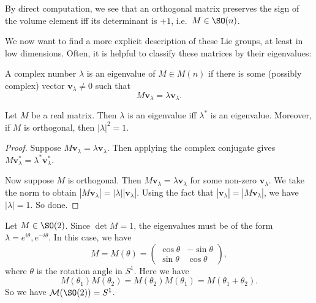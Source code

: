 \documentclass[a4paper]{article}
\begin{document}
By direct computation, we see that an orthogonal matrix preserves the sign of the volume element iff its determinant is $+1$, i.e.\ $M \in \SO(n)$.

We now want to find a more explicit description of these Lie groups, at least in low dimensions. Often, it is helpful to classify these matrices by their eigenvalues:

\begin{defi}[Eigenvalue]
  A complex number $\lambda$ is an eigenvalue of $M \in M(n)$ if there is some (possibly complex) vector $\mathbf{v}_\lambda \not= 0$ such that
  \[
    M \mathbf{v}_\lambda = \lambda \mathbf{v}_\lambda.
  \]
\end{defi}

\begin{thm}
  Let $M$ be a real matrix. Then $\lambda$ is an eigenvalue iff $\lambda^*$ is an eigenvalue. Moreover, if $M$ is orthogonal, then $|\lambda|^2 = 1$.
\end{thm}

\begin{proof}
  Suppose $M \mathbf{v}_\lambda = \lambda \mathbf{v}_\lambda$. Then applying the complex conjugate gives $M \mathbf{v}_\lambda^* = \lambda^* \mathbf{v}_\lambda^*$.

  Now suppose $M$ is orthogonal. Then $M\mathbf{v}_\lambda = \lambda \mathbf{v}_\lambda$ for some non-zero $\mathbf{v}_\lambda$. We take the norm to obtain $|M\mathbf{v}_\lambda| = |\lambda| |\mathbf{v}_\lambda|$. Using the fact that $|\mathbf{v}_\lambda| = |M\mathbf{v}_\lambda|$, we have $|\lambda| = 1$. So done.
\end{proof}

\begin{eg}
  Let $M \in \SO(2)$. Since $\det M = 1$, the eigenvalues must be of the form $\lambda = e^{i\theta}, e^{-i\theta}$. In this case, we have
  \[
    M = M(\theta) =
    \begin{pmatrix}
      \cos \theta & -\sin \theta\\
      \sin \theta & \cos \theta
    \end{pmatrix},
  \]
  where $\theta$ is the rotation angle in $S^1$. Here we have
  \[
    M(\theta_1)M(\theta_2) = M(\theta_2) M(\theta_1) = M(\theta_1 + \theta_2).
  \]
  So we have $\mathcal{M}(\SO(2)) = S^1$.
\end{eg}
\end{document}
